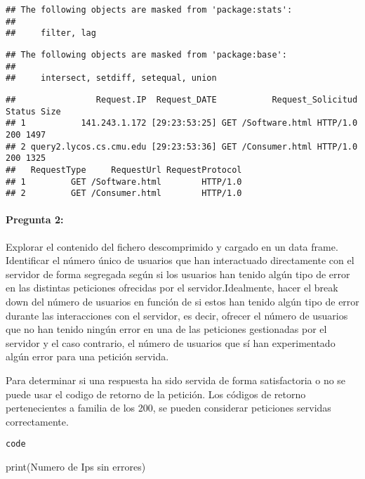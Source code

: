 \documentclass[
]{article}
\newenvironment{Shaded}{\begin{snugshade}}{\end{snugshade}}
\newcommand{\FunctionTok}[1]{\textcolor[rgb]{0.00,0.00,0.00}{#1}}
\newcommand{\NormalTok}[1]{#1}
\newcommand{\StringTok}[1]{\textcolor[rgb]{0.31,0.60,0.02}{#1}}
\begin{document}
\begin{verbatim}
## The following objects are masked from 'package:stats':
## 
##     filter, lag
\end{verbatim}

\begin{verbatim}
## The following objects are masked from 'package:base':
## 
##     intersect, setdiff, setequal, union
\end{verbatim}

\begin{verbatim}
##                Request.IP  Request_DATE           Request_Solicitud Status Size
## 1           141.243.1.172 [29:23:53:25] GET /Software.html HTTP/1.0    200 1497
## 2 query2.lycos.cs.cmu.edu [29:23:53:36] GET /Consumer.html HTTP/1.0    200 1325
##   RequestType     RequestUrl RequestProtocol
## 1         GET /Software.html        HTTP/1.0
## 2         GET /Consumer.html        HTTP/1.0
\end{verbatim}

\hypertarget{pregunta-2}{%
\paragraph{Pregunta 2:}\label{pregunta-2}}

Explorar el contenido del fichero descomprimido y cargado en un data
frame. Identificar el número único de usuarios que han interactuado
directamente con el servidor de forma segregada según si los usuarios
han tenido algún tipo de error en las distintas peticiones ofrecidas por
el servidor.Idealmente, hacer el break down del número de usuarios en
función de si estos han tenido algún tipo de error durante las
interacciones con el servidor, es decir, ofrecer el número de usuarios
que no han tenido ningún error en una de las peticiones gestionadas por
el servidor y el caso contrario, el número de usuarios que sí han
experimentado algún error para una petición servida.

Para determinar si una respuesta ha sido servida de forma satisfactoria
o no se puede usar el codigo de retorno de la petición. Los códigos de
retorno pertenecientes a familia de los 200, se pueden considerar
peticiones servidas correctamente.

\texttt{code}

\begin{Shaded}
\begin{Highlighting}[]
\FunctionTok{print}\NormalTok{(}\StringTok{\textquotesingle{}Numero de Ips sin errores\textquotesingle{}}\NormalTok{)}
\end{Highlighting}
\end{Shaded}
\end{document}
